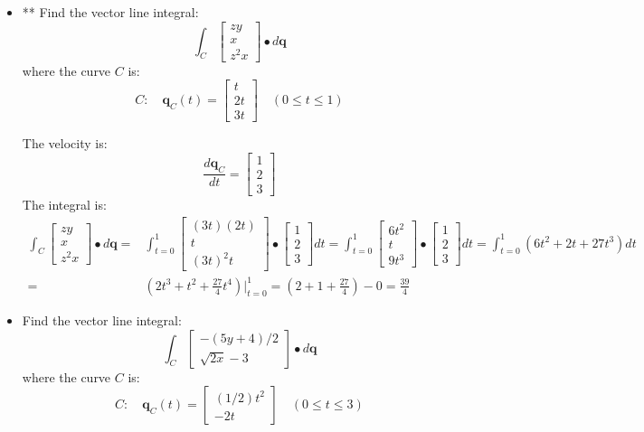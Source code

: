 \documentclass{article}
\begin{document}
\begin{itemize}
\item** 
Find the vector line integral: 
\[\int_C \begin{bmatrix} zy \\ x \\ z^2x \end{bmatrix} \bullet d\mathbf{q}\]
where the curve \(C\) is:
\[C : \quad 
\mathbf{q}_C(t) = \begin{bmatrix} 
t \\ 2t \\ 3t  
\end{bmatrix} \quad 
(0 \leq t \leq 1)\]

The velocity is:
\[\frac{d\mathbf{q}_C}{dt} = \begin{bmatrix} 
1 \\ 2 \\ 3  
\end{bmatrix}\]
The integral is:
\begin{align*}
\int_C \begin{bmatrix} zy \\ x \\ z^2x \end{bmatrix} \bullet d\mathbf{q}
= & \int_{t=0}^1 \begin{bmatrix} (3t)(2t) \\ t \\ (3t)^2t \end{bmatrix} \bullet \begin{bmatrix} 1 \\ 2 \\ 3 \end{bmatrix}dt
= \int_{t=0}^1 \begin{bmatrix} 6t^2 \\ t \\ 9t^3 \end{bmatrix} \bullet \begin{bmatrix} 1 \\ 2 \\ 3 \end{bmatrix}dt 
= \int_{t=0}^1 (6t^2 + 2t + 27t^3)dt \\
= & (2t^3 + t^2 + \frac{27}{4}t^4)\bigg|_{t=0}^1 
= (2 + 1 + \frac{27}{4}) - 0 
= \frac{39}{4}
\end{align*}

\item 
Find the vector line integral: 
\[\int_C \begin{bmatrix} -(5y + 4)/2 \\ \sqrt{2x} - 3 \end{bmatrix} \bullet d\mathbf{q}\]
where the curve \(C\) is:
\[C : \quad 
\mathbf{q}_C(t) = \begin{bmatrix} 
(1/2)t^2 \\ -2t   
\end{bmatrix} \quad 
(0 \leq t \leq 3)\]


\end{itemize}
\end{document}
